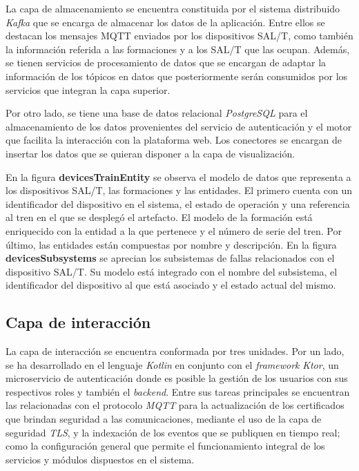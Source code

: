 La capa de almacenamiento se encuentra constituida por el sistema distribuido \textit{Kafka} que se encarga de almacenar los datos de la aplicación. Entre ellos se destacan los mensajes MQTT enviados por los dispositivos SAL/T, como también la información referida a las formaciones y a los SAL/T que las ocupan. Además, se tienen servicios de procesamiento de datos que se encargan de adaptar la información de los tópicos en datos que posteriormente serán consumidos por los servicios que integran la capa superior.

Por otro lado, se tiene una base de datos relacional \textit{PostgreSQL} para el almacenamiento de los datos provenientes del servicio de autenticación y el motor que facilita la interacción con la plataforma web. Los conectores se encargan de insertar los datos que se quieran disponer a la capa de visualización.


En la figura \textbf{devicesTrainEntity} se observa el modelo de datos que representa a los dispositivos SAL/T, las formaciones y las entidades. 
El primero cuenta con un identificador del dispositivo en el sistema, el estado de operación y una referencia al tren en el que se desplegó el artefacto. 
El modelo de la formación está enriquecido con la entidad a la que pertenece y el número de serie del tren. 
Por último, las entidades están compuestas por nombre y descripción.
En la figura \textbf{devicesSubsystems} se aprecian los subsistemas de fallas relacionados con el dispositivo SAL/T. Su modelo está integrado con el nombre del subsistema, el identificador del dispositivo al que está asociado y el estado actual del mismo. 

\subsection{Capa de interacción}

La capa de interacción se encuentra conformada por tres unidades. Por un lado, se ha desarrollado en el lenguaje \textit{Kotlin} en conjunto con el \textit{framework} \textit{Ktor}, un microservicio de autenticación donde es posible la gestión de los usuarios con sus respectivos roles y también el \textit{backend}. Entre sus tareas principales se encuentran las relacionadas con el protocolo \textit{MQTT} para la actualización de los certificados que brindan seguridad a las comunicaciones, mediante el uso de la capa de seguridad \textit{TLS}, y la indexación de los eventos que se publiquen en tiempo real; como la configuración general que permite el funcionamiento integral de los servicios y módulos dispuestos en el sistema. \\

